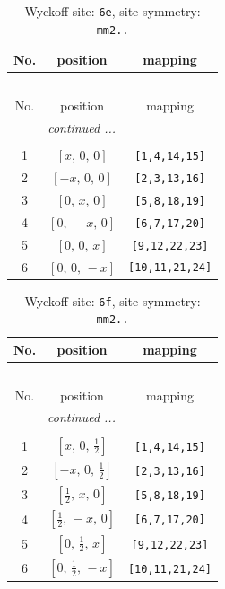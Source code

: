 \documentclass[fleqn,8pt]{jsarticle}
\begin{document}
\begin{longtable}{ccc}
\caption{Wyckoff site: {\tt 6e}, site symmetry: {\tt mm2..}}
 \\
 \hline \hline
No. & position & mapping \\ \hline \endfirsthead

\multicolumn{2}{l}{\tablename\ \thetable{}} \\
 \hline \hline
No. & position & mapping \\ \hline \endhead

 \hline \hline
\multicolumn{2}{r}{\footnotesize\it continued ...} \\ \endfoot

 \hline \hline
\multicolumn{2}{r}{} \\ \endlastfoot

1 & $\left[ x,\, 0,\, 0 \right]$ & {\tt [1,4,14,15]} \\ \hline
2 & $\left[ - x,\, 0,\, 0 \right]$ & {\tt [2,3,13,16]} \\ \hline
3 & $\left[ 0,\, x,\, 0 \right]$ & {\tt [5,8,18,19]} \\ \hline
4 & $\left[ 0,\, - x,\, 0 \right]$ & {\tt [6,7,17,20]} \\ \hline
5 & $\left[ 0,\, 0,\, x \right]$ & {\tt [9,12,22,23]} \\ \hline
6 & $\left[ 0,\, 0,\, - x \right]$ & {\tt [10,11,21,24]} \\
\end{longtable}
\renewcommand{\arraystretch}{1.2}
\begin{longtable}{ccc}
\caption{Wyckoff site: {\tt 6f}, site symmetry: {\tt mm2..}}
 \\
 \hline \hline
No. & position & mapping \\ \hline \endfirsthead

\multicolumn{2}{l}{\tablename\ \thetable{}} \\
 \hline \hline
No. & position & mapping \\ \hline \endhead

 \hline \hline
\multicolumn{2}{r}{\footnotesize\it continued ...} \\ \endfoot

 \hline \hline
\multicolumn{2}{r}{} \\ \endlastfoot

1 & $\left[ x,\, 0,\, \frac{1}{2} \right]$ & {\tt [1,4,14,15]} \\ \hline
2 & $\left[ - x,\, 0,\, \frac{1}{2} \right]$ & {\tt [2,3,13,16]} \\ \hline
3 & $\left[ \frac{1}{2},\, x,\, 0 \right]$ & {\tt [5,8,18,19]} \\ \hline
4 & $\left[ \frac{1}{2},\, - x,\, 0 \right]$ & {\tt [6,7,17,20]} \\ \hline
5 & $\left[ 0,\, \frac{1}{2},\, x \right]$ & {\tt [9,12,22,23]} \\ \hline
6 & $\left[ 0,\, \frac{1}{2},\, - x \right]$ & {\tt [10,11,21,24]} \\
\end{longtable}
\end{document}
